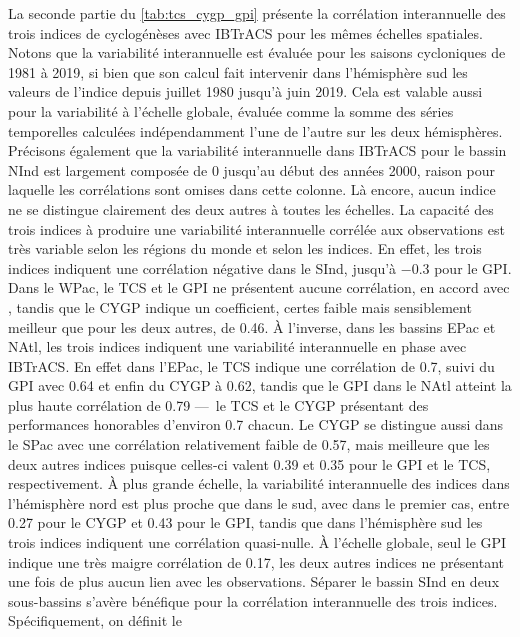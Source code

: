 \documentclass[../main.tex]{subfiles}
\begin{document}
La seconde partie du \cref{tab:tcs_cygp_gpi} présente la corrélation interannuelle des trois indices de cyclogénèses avec IBTrACS pour les mêmes échelles
spatiales. Notons que la variabilité interannuelle est évaluée pour les saisons cycloniques de \num{1981} à \num{2019}, si bien que son calcul fait intervenir
dans l'hémisphère sud les valeurs de l'indice depuis juillet 1980 jusqu'à juin 2019. Cela est valable aussi pour la variabilité à l'échelle globale, évaluée
comme la somme des séries temporelles calculées indépendamment l'une de l'autre sur les deux hémisphères. Précisons également que la variabilité interannuelle
dans IBTrACS pour le bassin NInd est largement composée de \num{0} jusqu'au début des années 2000, raison pour laquelle les corrélations sont omises dans cette
colonne. Là encore, aucun indice ne se distingue clairement des deux autres à toutes les échelles. La capacité des trois indices à produire une variabilité
interannuelle corrélée aux observations est très variable selon les régions du monde et selon les indices. En effet, les trois indices indiquent une corrélation
négative dans le SInd, jusqu'à \num{-0.3} pour le GPI. Dans le WPac, le TCS et le GPI ne présentent aucune corrélation, en accord avec
\textcite{wang_dynamic_2020}, tandis que le CYGP indique un coefficient, certes faible mais sensiblement meilleur que pour les deux autres, de \num{0.46}. À
l'inverse, dans les bassins EPac et NAtl, les trois indices indiquent une variabilité interannuelle en phase avec IBTrACS. En effet dans l'EPac, le TCS indique
une corrélation de \num{0.7}, suivi du GPI avec \num{0.64} et enfin du CYGP à \num{0.62}, tandis que le GPI dans le NAtl atteint la plus haute corrélation de
\num{0.79} ---~le TCS et le CYGP présentant des performances honorables d'environ \num{0.7} chacun. Le CYGP se distingue aussi dans le SPac avec une corrélation
relativement faible de \num{0.57}, mais meilleure que les deux autres indices puisque celles-ci valent \num{0.39} et \num{0.35} pour le GPI et le TCS,
respectivement. À plus grande échelle, la variabilité interannuelle des indices dans l'hémisphère nord est plus proche que dans le sud, avec dans le premier
cas, entre \num{0.27} pour le CYGP et \num{0.43} pour le GPI, tandis que dans l'hémisphère sud les trois indices indiquent une corrélation quasi-nulle. À
l'échelle globale, seul le GPI indique une très maigre corrélation de \num{0.17}, les deux autres indices ne présentant une fois de plus aucun lien avec les
observations. Séparer le bassin SInd en deux sous-bassins s'avère bénéfique pour la corrélation interannuelle des trois indices. Spécifiquement, on définit le
\end{document}
